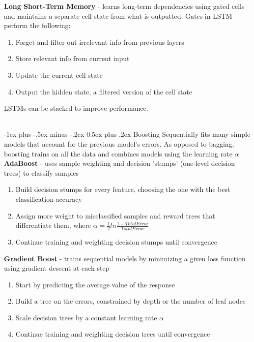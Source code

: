 \documentclass[10pt,landscape]{article}
\makeatletter
\renewcommand{\section}{\@startsection{section}{1}{0mm}%
                                {-1ex plus -.5ex minus -.2ex}%
                                {0.5ex plus .2ex}%
                                {\normalfont\large\bfseries}}
\makeatother
\begin{document}
\begin{multicols}{3}
\textbf{Long Short-Term Memory} - learns long-term dependencies using gated cells and maintains a separate cell state from what is outputted. Gates in LSTM perform the following:

\begin{enumerate}[leftmargin=5mm]
\itemsep -.4mm
\item Forget and filter out irrelevant info from previous layers
\item Store relevant info from current input
\item Update the current cell state
\item Output the hidden state, a filtered version of the cell state
\end{enumerate}
LSTMs can be stacked to improve performance.

\columnbreak
\textcolor{white}{.}\vspace{-3mm}\\ %
\section{Boosting}
Sequentially fits many simple models that account for the previous model's errors. As opposed to bagging, boosting trains on all the data and combines models using the learning rate $\alpha$. \\
\smallskip
\textbf{AdaBoost} - uses sample weighting and decision 'stumps' (one-level decision trees) to classify samples
\begin{enumerate}[leftmargin=5mm]
\itemsep -.4mm
\item Build decision stumps for every feature, choosing the one with the best classification accuracy
\item Assign more weight to misclassified samples and reward trees that differentiate them, where  $\alpha = \frac{1}{2}ln\frac{1-TotalError}{TotalError}$
\item Continue training and weighting decision stumps until convergence
\end{enumerate}

\textbf{Gradient Boost} - trains sequential models by minimizing a given loss function using gradient descent at each step
\begin{enumerate}[leftmargin=5mm]
\itemsep -.4mm
\item Start by predicting the average value of the response
\item Build a tree on the errors, constrained by depth or the number of leaf nodes
\item Scale decision trees by a constant learning rate $\alpha$
\item Continue training and weighting decision trees until convergence
\end{enumerate}


\end{multicols}
\end{document}
